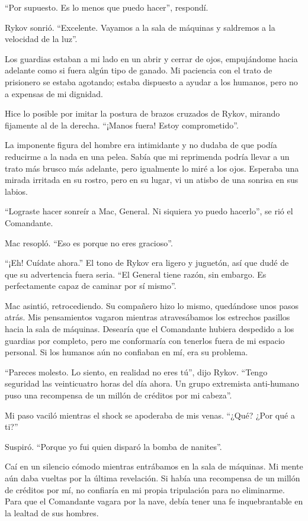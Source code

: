 \documentclass[spanish,12pt,a4paper,oneside,titlepage]{book}
\begin{document}
    ``Por supuesto. Es lo menos que puedo hacer'', respondí.

    Rykov sonrió. ``Excelente. Vayamos a la sala de máquinas y saldremos a la velocidad de la luz''.

    Los guardias estaban a mi lado en un abrir y cerrar de ojos, empujándome hacia adelante como si fuera algún tipo de ganado. Mi paciencia con el trato de prisionero se estaba agotando; estaba dispuesto a ayudar a los humanos, pero no a expensas de mi dignidad.

    Hice lo posible por imitar la postura de brazos cruzados de Rykov, mirando fijamente al de la derecha. ``¡Manos fuera! Estoy comprometido''.

    La imponente figura del hombre era intimidante y no dudaba de que podía reducirme a la nada en una pelea. Sabía que mi reprimenda podría llevar a un trato más brusco más adelante, pero igualmente lo miré a los ojos. Esperaba una mirada irritada en su rostro, pero en su lugar, vi un atisbo de una sonrisa en sus labios.

    ``Lograste hacer sonreír a Mac, General. Ni siquiera yo puedo hacerlo'', se rió el Comandante.

    Mac resopló. ``Eso es porque no eres gracioso''.

    ``¡Eh! Cuídate ahora.'' El tono de Rykov era ligero y juguetón, así que dudé de que su advertencia fuera seria. ``El General tiene razón, sin embargo. Es perfectamente capaz de caminar por sí mismo''.

    Mac asintió, retrocediendo. Su compañero hizo lo mismo, quedándose unos pasos atrás. Mis pensamientos vagaron mientras atravesábamos los estrechos pasillos hacia la sala de máquinas. Desearía que el Comandante hubiera despedido a los guardias por completo, pero me conformaría con tenerlos fuera de mi espacio personal. Si los humanos aún no confiaban en mí, era su problema.

    ``Pareces molesto. Lo siento, en realidad no eres tú'', dijo Rykov. ``Tengo seguridad las veinticuatro horas del día ahora. Un grupo extremista anti-humano puso una recompensa de un millón de créditos por mi cabeza''.

    Mi paso vaciló mientras el shock se apoderaba de mis venas. ``¿Qué? ¿Por qué a ti?''

    Suspiró. ``Porque yo fui quien disparó la bomba de nanites''.

    Caí en un silencio cómodo mientras entrábamos en la sala de máquinas. Mi mente aún daba vueltas por la última revelación. Si había una recompensa de un millón de créditos por mí, no confiaría en mi propia tripulación para no eliminarme. Para que el Comandante vagara por la nave, debía tener una fe inquebrantable en la lealtad de sus hombres.
\end{document}
